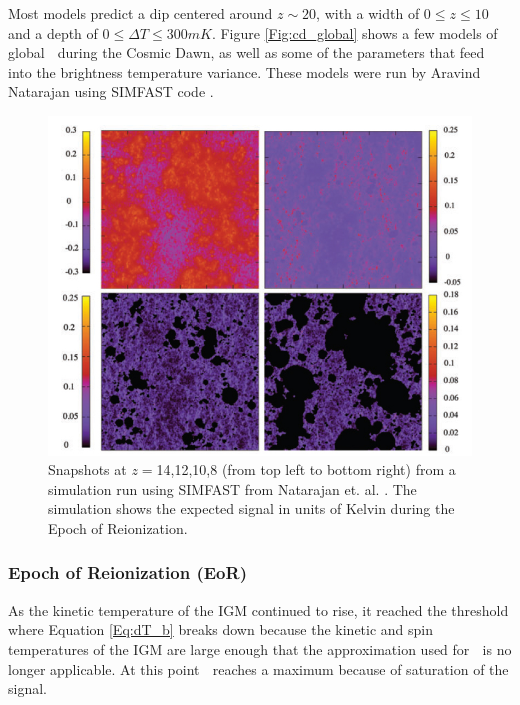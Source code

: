 Most models predict a dip centered around $z\sim20$, with a width of $0 \leq z \leq 10$ and a depth of $0\leq \Delta T \leq 300 mK$. Figure \ref{Fig:cd_global} shows a few models of global \dtb$\;$ during the Cosmic Dawn, as well as some of the parameters that feed into the brightness temperature variance. These models were run by Aravind Natarajan using SIMFAST code \cite{simfast}\cite{21cmfast}\cite{natarajan_2014}.  

\begin{figure}[htb]
\begin{center}
\includegraphics[width=0.95\linewidth]{Introduction/figures/reionization.jpg}
\caption{Snapshots at $z=$14,12,10,8 (from top left to bottom right) from a simulation run using SIMFAST from Natarajan et. al. \cite{natarajan_2014}. The simulation shows the expected \dtb signal in units of Kelvin during the Epoch of Reionization. }
\label{Fig:eor}
\end{center}
\end{figure}

\subsubsection{Epoch of Reionization (EoR)}

As the kinetic temperature of the IGM continued to rise, it reached the threshold where Equation \ref{Eq:dT_b} breaks down because the kinetic and spin temperatures of the IGM are large enough that the approximation used for \tu $\;$ is no longer applicable. At this point \dtb$\;$ reaches a maximum because of saturation of the signal. 

